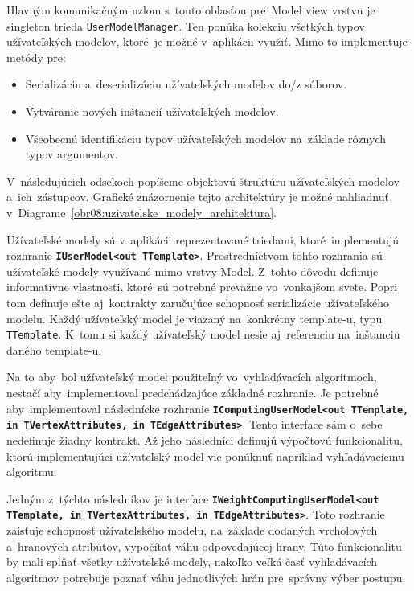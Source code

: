 Hlavným komunikačným uzlom s~touto oblasťou pre~Model view vrstvu je singleton trieda \texttt{UserModelManager}. Ten ponúka kolekciu všetkých typov užívateľských modelov, ktoré~je možné v~aplikácii využiť. Mimo to implementuje metódy pre:
\begin{itemize}
    \item Serializáciu a~deserializáciu užívateľských modelov do/z súborov.
    \item Vytváranie nových inštancií užívateľských modelov.
    \item Všeobecnú identifikáciu typov užívateľských modelov na~základe rôznych typov argumentov.
\end{itemize}

V~následujúcich odsekoch popíšeme objektovú štruktúru užívateľských modelov a~ich~zástupcov. Grafické znázornenie tejto architektúry je možné nahliadnuť v~Diagrame~\ref{obr08:uzivatelske_modely_architektura}.   

\bigskip

Užívateľské modely sú v~aplikácii reprezentované triedami, ktoré~implementujú rozhranie \textbf{\texttt{IUserModel<out TTemplate>}}.  Prostredníctvom tohto rozhrania sú užívateľské modely využívané mimo vrstvy Model. Z~tohto dôvodu definuje informatívne vlastnosti, ktoré~sú potrebné prevažne vo~vonkajšom svete. Popri tom definuje ešte aj~kontrakty zaručujúce schopnosť serializácie užívateľského modelu. Každý užívateľský model je viazaný na~konkrétny template-u, typu \texttt{TTemplate}. K~tomu si každý užívateľský model nesie aj~referenciu na~inštanciu daného template-u.

Na to aby~bol užívateľský model použiteľný vo~vyhľadávacích algoritmoch, nestačí aby~implementoval predchádzajúce základné rozhranie. Je potrebné aby~implementoval následnícke rozhranie \textbf{\texttt{IComputingUserModel<out TTemplate, in TVertexAttributes, in TEdgeAttributes>}}. Tento interface sám o~sebe nedefinuje žiadny kontrakt. Až jeho následníci definujú výpočtovú funkcionalitu, ktorú implementujúci užívateľský model vie ponúknuť napríklad vyhľadávaciemu algoritmu. 

Jedným z~týchto následníkov je interface \textbf{\texttt{IWeightComputingUserModel<out TTemplate, in TVertexAttributes, in TEdgeAttributes>}}. Toto rozhranie zaisťuje schopnosť užívateľského modelu, na~základe dodaných vrcholových a~hranových atribútov, vypočítať váhu odpovedajúcej hrany. Túto funkcionalitu by mali spĺňať všetky užívateľské modely, nakoľko veľká časť vyhľadávacích algoritmov potrebuje poznať váhu jednotlivých hrán pre~správny výber postupu.

